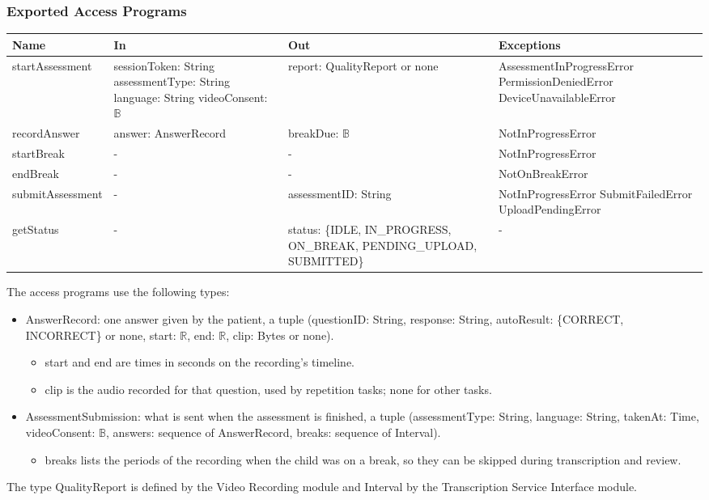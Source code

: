 \documentclass[12pt, titlepage]{article}
\begin{document}
\subsubsection{Exported Access Programs}
{\small
\begin{longtable}{>{\raggedright\arraybackslash}p{3.4cm} >{\raggedright\arraybackslash}p{4.3cm} >{\raggedright\arraybackslash}p{3.2cm} >{\raggedright\arraybackslash}p{4.3cm}}
\hline
\textbf{Name} & \textbf{In} & \textbf{Out} & \textbf{Exceptions} \\
\hline
\endhead
startAssessment & sessionToken: String \newline assessmentType: String \newline language: String \newline videoConsent: $\mathbb{B}$ & report: QualityReport or none & AssessmentInProgressError \newline PermissionDeniedError \newline DeviceUnavailableError \\[4pt]
recordAnswer & answer: AnswerRecord & breakDue: $\mathbb{B}$ & NotInProgressError \\[4pt]
startBreak & - & - & NotInProgressError \\[4pt]
endBreak & - & - & NotOnBreakError \\[4pt]
submitAssessment & - & assessmentID: String & NotInProgressError \newline SubmitFailedError \newline UploadPendingError \\[4pt]
getStatus & - & status: \{IDLE, IN\_PROGRESS, ON\_BREAK, PENDING\_UPLOAD, SUBMITTED\} & - \\[4pt]
\hline
\end{longtable}
}

\noindent The access programs use the following types:
\begin{itemize}
\item AnswerRecord: one answer given by the patient, a tuple (questionID: String, response: String, autoResult: \{CORRECT, INCORRECT\} or none, start: $\mathbb{R}$, end: $\mathbb{R}$, clip: Bytes or none).
  \begin{itemize}
  \item start and end are times in seconds on the recording's timeline.
  \item clip is the audio recorded for that question, used by repetition tasks; none for other tasks.
  \end{itemize}
\item AssessmentSubmission: what is sent when the assessment is finished, a tuple (assessmentType: String, language: String, takenAt: Time, videoConsent: $\mathbb{B}$, answers: sequence of AnswerRecord, breaks: sequence of Interval).
  \begin{itemize}
  \item breaks lists the periods of the recording when the child was on a break, so they can be skipped during transcription and review.
  \end{itemize}
\end{itemize}
The type QualityReport is defined by the Video Recording module and Interval by the Transcription Service Interface module.
\end{document}
